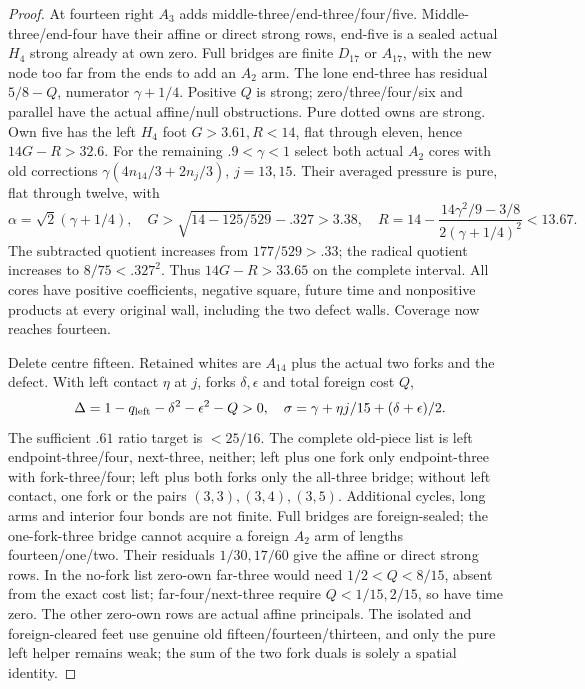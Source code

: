 \documentclass[11pt]{article}
\theoremstyle{definition}
\theoremstyle{remark}
\begin{document}
\begin{proof}
At fourteen right $A_3$ adds middle-three/end-three/four/five.
Middle-three/end-four have their affine or direct strong rows,
end-five is a sealed actual $H_4$ strong already at own zero.
Full bridges are finite $D_{17}$ or $A_{17}$, with the new
node too far from the ends to add an $A_2$ arm.
The lone end-three has residual $5/8-Q$, numerator
$\gamma+1/4$. Positive $Q$ is strong; zero/three/four/six
and parallel have the actual affine/null obstructions.
Pure dotted owns are strong. Own five has the left $H_4$
foot $G>3.61,R<14$, flat through eleven, hence $14G-R>32.6$.
For the remaining $.9<\gamma<1$ select both actual $A_2$
cores with old corrections
$\gamma(4n_{14}/3+2n_j/3)$, $j=13,15$.
Their averaged pressure is pure, flat through twelve, with
\[
 \alpha=\sqrt2(\gamma+1/4),\quad
 G>\sqrt{14-125/529}-.327>3.38,\quad
 R=14-{\frac{14\gamma^2/9-3/8}{2(\gamma+1/4)^2}}<13.67.
\]
The subtracted quotient increases from $177/529> .33$;
the radical quotient increases to $8/75<.327^2$.
Thus $14G-R>33.65$ on the complete interval.
All cores have positive coefficients, negative square, future
time and nonpositive products at every original wall, including
the two defect walls. Coverage now reaches fourteen.

Delete centre fifteen. Retained whites are $A_{14}$ plus
the actual two forks and the defect. With left contact $\eta$
at $j$, forks $\delta,\epsilon$ and total foreign cost $Q$,
\[
 \Delta=1-q_{\rm left}-\delta^2-\epsilon^2-Q>0,
 \quad\sigma=\gamma+\eta j/15+(\delta+\epsilon)/2.
\]
The sufficient $.61$ ratio target is $<25/16$.
The complete old-piece list is left endpoint-three/four,
next-three, neither; left plus one fork only endpoint-three
with fork-three/four; left plus both forks only the all-three
bridge; without left contact, one fork or the pairs
$(3,3),(3,4),(3,5)$. Additional cycles, long arms and interior
four bonds are not finite. Full bridges are foreign-sealed;
the one-fork-three bridge cannot acquire a foreign $A_2$ arm
of lengths fourteen/one/two. Their residuals $1/30,17/60$
give the affine or direct strong rows.
In the no-fork list zero-own far-three would need
$1/2<Q<8/15$, absent from the exact cost list;
far-four/next-three require $Q<1/15,2/15$, so have time zero.
The other zero-own rows are actual affine principals.
The isolated and foreign-cleared feet use genuine old
fifteen/fourteen/thirteen, and only the pure left helper remains
weak; the sum of the two fork duals is solely a spatial identity.


\end{proof}
\end{document}
